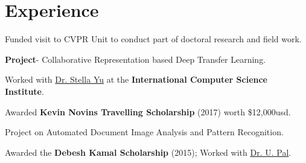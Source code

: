 \documentclass[letterpaper]{tap-resume}
\begin{document}
\begin{minipage}[t]{0.66\textwidth} %


\section{Experience}

\sectionspace


\vspace{\parsep}
\vspace{\parsep}
\begin{tightitemize}
\item Funded visit to CVPR Unit to conduct part of doctoral research and field work.
\end{tightitemize}

\sectionspace 


\begin{tightitemize}
\item \textbf{Project}- Collaborative Representation based Deep Transfer Learning.
\item Worked with \href{http://www1.icsi.berkeley.edu/~stellayu/}{Dr. Stella Yu} at the \textbf{International Computer Science Institute}.
\item Awarded \textbf{Kevin Novins Travelling Scholarship} (2017) worth \$12,000usd.


\end{tightitemize}

\sectionspace 


\begin{tightitemize}
\item Project on Automated Document Image Analysis and Pattern Recognition.
\item Awarded the \textbf{Debesh Kamal Scholarship} (2015); Worked with \href{http://www.isical.ac.in/~umapada/}{Dr. U. Pal}.
\end{tightitemize}


\end{minipage}
\end{document}
